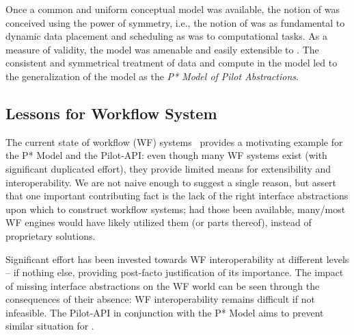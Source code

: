 \documentclass{sig-alternate}
\begin{document}
Once a common and uniform conceptual model was available, the notion
of \pilotdata was conceived using the power of symmetry, i.e., the
notion of \pilotdata was as fundamental to dynamic data placement and
scheduling as \pilotjobs was to computational tasks. As a measure of
validity, the \pstar model was amenable and easily extensible to
\pilotdata.  The consistent and symmetrical treatment of data and
compute in the model led to the generalization of the model as the
{\it P* Model of Pilot Abstractions}.


\subsection{Lessons for Workflow System}

The current state of workflow (WF) systems~\cite{nsf-workflow,1196459}
provides a motivating example for the P* Model and the Pilot-API: even
though many WF systems exist (with significant duplicated effort),
they provide limited means for extensibility and interoperability.  We
are not naive enough to suggest a single reason, but assert that one
important contributing fact is the lack of the right interface
abstractions upon which to construct workflow systems; had those been
available, many/most WF engines would have likely utilized them (or
parts thereof), instead of proprietary solutions.


Significant effort has been invested towards WF interoperability at
different levels -- if nothing else, providing post-facto
justification of its importance. The impact of missing interface
abstractions on the WF world can be seen through the consequences of
their absence: WF interoperability remains difficult if not
infeasible. The Pilot-API in conjunction with the P* Model aims to
prevent similar situation for \pilotjobs.

\end{document}
